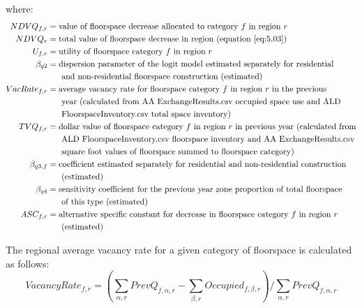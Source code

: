 \noindent where:
\allowdisplaybreaks
\begin{align*}
NDVQ_{f,r} &= \text{value of floorspace decrease allocated to category $f$ in region $r$} \\
NDVQ_r &= \text{total value of floorspace decrease in region (equation \ref{eq:5.03})} \\
U_{f,r} &= \text{utility of floorspace category $f$ in region $r$} \\
\beta_{q2} &= \text{dispersion parameter of the logit model estimated separately for residential} \\
 &~~~~~\text{and non-residential floorspace construction (estimated)} \\
VacRate_{f,r} &= \text{average vacancy rate for floorspace category $f$ in region $r$ in the previous} \\
 &~~~~~\text{year (calculated from AA ExchangeResults.csv occupied space use and ALD} \\
 &~~~~~\text{FloorspaceInventory.csv total space inventory)} \\
TVQ_{f,r} &= \text{dollar value of floorspace category $f$ in region $r$ in previous year (calculated from} \\
 &~~~~~\text{ALD FloorspaceInventory.csv floorspace inventory and AA ExchangeResults.csv} \\
 &~~~~~\text{square foot values of floorspace summed to floorspace category)} \\
\beta_{q3,f} &= \text{coefficient estimated separately for residential and non-residential construction} \\
 &~~~~~\text{(estimated)} \\
\beta_{q4} &= \text{sensitivity coefficient for the previous year zone proportion of total floorspace} \\
 &~~~~~\text{of this type (estimated)} \\
ASC_{f,r} &= \text{alternative specific constant for decrease in floorspace category $f$ in region $r$} \\
 &~~~~~\text{(estimated)}
\end{align*}

\noindent The regional average vacancy rate for a given category of floorspace is calculated as follows:
\begin{equation}   %
VacancyRate_{f,r} = \left( \sum_{\alpha,r} PrevQ_{f,\alpha,r} - \sum_{\beta,r} Occupied_{f,\beta,r} \right) / \sum_{\alpha,r} PrevQ_{f,\alpha,r}
\end{equation}

